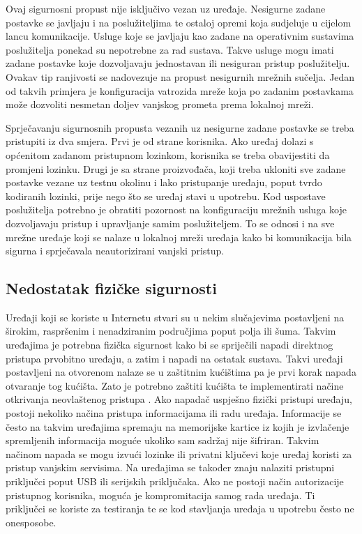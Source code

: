 \documentclass[times, utf8, diplomski]{fer}
\begin{document}
Ovaj sigurnosni propust nije isključivo vezan uz uređaje. Nesigurne zadane postavke se javljaju i na poslužiteljima te ostaloj opremi koja sudjeluje u cijelom lancu komunikacije. Usluge koje se javljaju kao zadane na operativnim sustavima poslužitelja ponekad su nepotrebne za rad sustava. Takve usluge mogu imati zadane postavke koje dozvoljavaju jednostavan ili nesiguran pristup poslužitelju. Ovakav tip ranjivosti se nadovezuje na propust nesigurnih mrežnih sučelja. Jedan od takvih primjera je konfiguracija vatrozida mreže koja po zadanim postavkama može dozvoliti nesmetan doljev vanjskog prometa prema lokalnoj mreži.  

Sprječavanju sigurnosnih propusta vezanih uz nesigurne zadane postavke se treba pristupiti iz dva smjera. Prvi je od strane korisnika. Ako uređaj dolazi s općenitom zadanom pristupnom lozinkom, korisnika se treba obavijestiti da promjeni lozinku. Drugi je sa strane proizvođača, koji treba ukloniti sve zadane postavke vezane uz testnu okolinu i lako pristupanje uređaju, poput tvrdo kodiranih lozinki, prije nego što se uređaj stavi u upotrebu. Kod uspostave poslužitelja potrebno je obratiti pozornost na konfiguraciju mrežnih usluga koje dozvoljavaju pristup i upravljanje samim poslužiteljem. To se odnosi i na sve mrežne uređaje koji se nalaze u lokalnoj mreži uređaja kako bi komunikacija bila sigurna i sprječavala neautorizirani vanjski pristup.

\subsection{Nedostatak fizičke sigurnosti}
Uređaji koji se koriste u Internetu stvari su u nekim slučajevima postavljeni na širokim, raspršenim  i nenadziranim područjima poput polja ili šuma. Takvim uređajima je potrebna fizička sigurnost kako bi se spriječili napadi direktnog pristupa prvobitno uređaju, a zatim i napadi na ostatak sustava. Takvi uređaji postavljeni na otvorenom nalaze se u zaštitnim kućištima pa je prvi korak napada otvaranje tog kućišta. Zato je potrebno zaštiti kućišta te implementirati načine otkrivanja neovlaštenog pristupa . Ako napadač uspješno fizički pristupi uređaju, postoji nekoliko načina pristupa informacijama ili radu uređaja. Informacije se često na takvim uređajima spremaju na memorijske kartice iz kojih je izvlačenje spremljenih informacija moguće ukoliko sam sadržaj nije šifriran. Takvim načinom napada se mogu izvući lozinke ili privatni ključevi koje uređaj koristi za pristup vanjskim servisima. Na uređajima se također znaju nalaziti pristupni priključci poput USB ili serijskih priključaka. Ako ne postoji način autorizacije pristupnog korisnika, moguća je kompromitacija samog rada uređaja. Ti priključci se koriste za testiranja te se kod stavljanja uređaja u upotrebu često ne onesposobe.
\end{document}
